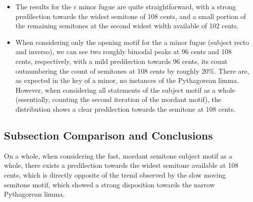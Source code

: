 \begin{itemize}
\tightlist
\item
  The results for the c minor fugue are quite straightforward, with a
  strong predilection towards the widest semitone of 108 cents, and a
  small portion of the remaining semitones at the second widest width
  available of 102 cents.
\item
  When considering only the opening motif for the a minor fugue (subject
  recto and inverso), we can see two roughly bimodal peaks at 96 cents
  and 108 cents, respectively, with a mild predilection towards 96
  cents, its count outnumbering the count of semitones at 108 cents by
  roughly 20\%. There are, as expected in the key of a minor, no
  instances of the Pythagorean limma. However, when considering all
  statements of the subject motif as a whole (essentially, counting the
  second iteration of the mordant motif), the distribution shows a clear
  predilection towards the semitone at 108 cents.
\end{itemize}

\subsection{Subsection Comparison and
Conclusions}\label{subsection-comparison-and-conclusions}

On a whole, when considering the fast, mordant semitone subject motif as
a whole, there exists a predilection towards the widest semitone
available at 108 cents, which is directly opposite of the trend observed
by the slow moving semitone motif, which showed a strong disposition
towards the narrow Pythagorean limma.



